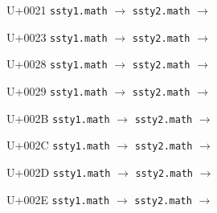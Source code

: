 \documentclass{article}
\begin{document}
\begin{substitutions}

U+0021  \linebreak
    \texttt{ssty1.math} $\to$  \linebreak
    \texttt{ssty2.math} $\to$  

\goodbreak

U+0023  \linebreak
    \texttt{ssty1.math} $\to$  \linebreak
    \texttt{ssty2.math} $\to$  

\goodbreak

U+0028  \linebreak
    \texttt{ssty1.math} $\to$  \linebreak
    \texttt{ssty2.math} $\to$  

\goodbreak

U+0029  \linebreak
    \texttt{ssty1.math} $\to$  \linebreak
    \texttt{ssty2.math} $\to$  

\goodbreak

U+002B  \linebreak
    \texttt{ssty1.math} $\to$  \linebreak
    \texttt{ssty2.math} $\to$  

\goodbreak

U+002C  \linebreak
    \texttt{ssty1.math} $\to$  \linebreak
    \texttt{ssty2.math} $\to$  

\goodbreak

U+002D  \linebreak
    \texttt{ssty1.math} $\to$  \linebreak
    \texttt{ssty2.math} $\to$  

\goodbreak

U+002E  \linebreak
    \texttt{ssty1.math} $\to$  \linebreak
    \texttt{ssty2.math} $\to$  

\goodbreak


\end{substitutions}
\end{document}
